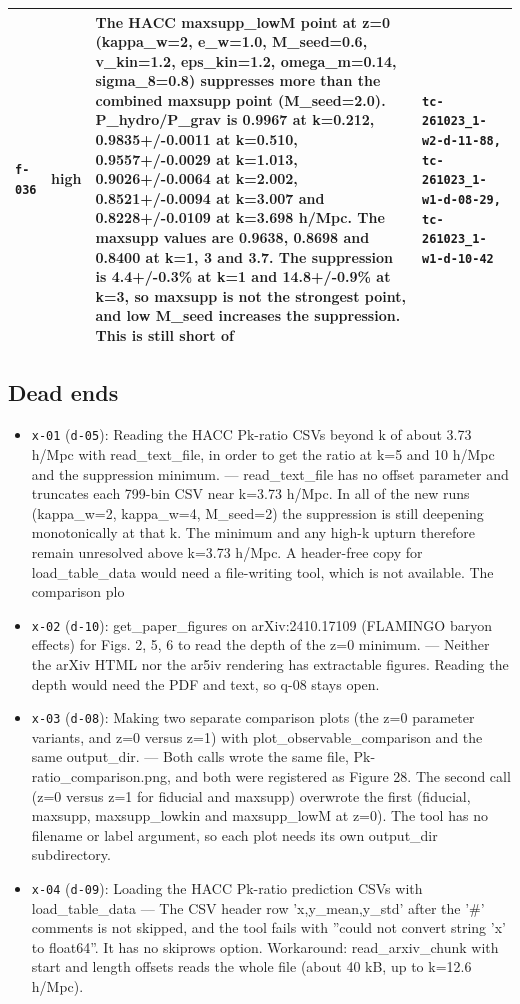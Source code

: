 \documentclass[11pt,a4paper]{article}
\begin{document}
\begin{longtable}{@{}p{}p{}p{}p{}@{}}
\texttt{f-036} & high & The HACC maxsupp\_lowM point at z=0 (kappa\_w=2, e\_w=1.0, M\_seed=0.6, v\_kin=1.2, eps\_kin=1.2, omega\_m=0.14, sigma\_8=0.8) suppresses more than the combined maxsupp point (M\_seed=2.0). P\_hydro/P\_grav is 0.9967 at k=0.212, 0.9835+/-0.0011 at k=0.510, 0.9557+/-0.0029 at k=1.013, 0.9026+/-0.0064 at k=2.002, 0.8521+/-0.0094 at k=3.007 and 0.8228+/-0.0109 at k=3.698 h/Mpc. The maxsupp values are 0.9638, 0.8698 and 0.8400 at k=1, 3 and 3.7. The suppression is 4.4+/-0.3\% at k=1 and 14.8+/-0.9\% at k=3, so maxsupp is not the strongest point, and low M\_seed increases the suppression. This is still short of  & \texttt{tc-261023\_\allowbreak{}1-w2-d-11-88,\allowbreak{} tc-261023\_\allowbreak{}1-w1-d-08-29,\allowbreak{} tc-261023\_\allowbreak{}1-w1-d-10-42} \\
\bottomrule\end{longtable}
\subsection{Dead ends}
\begin{itemize}
  \item \texttt{x-01} (\texttt{d-05}): Reading the HACC Pk-ratio CSVs beyond k of about 3.73 h/Mpc with read\_text\_file, in order to get the ratio at k=5 and 10 h/Mpc and the suppression minimum. --- read\_text\_file has no offset parameter and truncates each 799-bin CSV near k=3.73 h/Mpc. In all of the new runs (kappa\_w=2, kappa\_w=4, M\_seed=2) the suppression is still deepening monotonically at that k. The minimum and any high-k upturn therefore remain unresolved above k=3.73 h/Mpc. A header-free copy for load\_table\_data would need a file-writing tool, which is not available. The comparison plo
  \item \texttt{x-02} (\texttt{d-10}): get\_paper\_figures on arXiv:2410.17109 (FLAMINGO baryon effects) for Figs. 2, 5, 6 to read the depth of the z=0 minimum. --- Neither the arXiv HTML nor the ar5iv rendering has extractable figures. Reading the depth would need the PDF and text, so q-08 stays open.
  \item \texttt{x-03} (\texttt{d-08}): Making two separate comparison plots (the z=0 parameter variants, and z=0 versus z=1) with plot\_observable\_comparison and the same output\_dir. --- Both calls wrote the same file, Pk-ratio\_comparison.png, and both were registered as Figure 28. The second call (z=0 versus z=1 for fiducial and maxsupp) overwrote the first (fiducial, maxsupp, maxsupp\_lowkin and maxsupp\_lowM at z=0). The tool has no filename or label argument, so each plot needs its own output\_dir subdirectory.
  \item \texttt{x-04} (\texttt{d-09}): Loading the HACC Pk-ratio prediction CSVs with load\_table\_data --- The CSV header row 'x,y\_mean,y\_std' after the '\#' comments is not skipped, and the tool fails with ''could not convert string 'x' to float64''. It has no skiprows option. Workaround: read\_arxiv\_chunk with start and length offsets reads the whole file (about 40 kB, up to k=12.6 h/Mpc).
\end{itemize}
\end{document}

